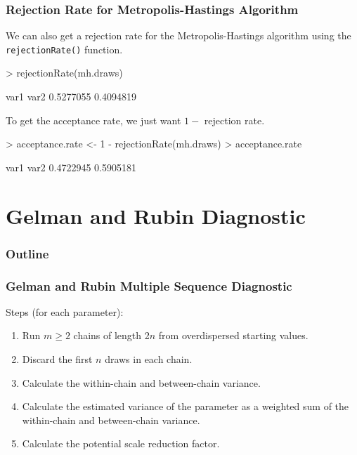 \documentclass{beamer}
\begin{document}
\begin{frame}[fragile]
\frametitle{Rejection Rate for Metropolis-Hastings Algorithm}
\pause
We can also get a rejection rate for the Metropolis-Hastings algorithm
using the {\tt rejectionRate()} function.
\pause
\medskip
\tiny
\begin{Schunk}
\begin{Sinput}
> rejectionRate(mh.draws)
\end{Sinput}
\begin{Soutput}
     var1      var2 
0.5277055 0.4094819 
\end{Soutput}
\end{Schunk}
\normalsize
\bigskip
\pause
To get the acceptance rate, we just want $1 - $ rejection rate.
\pause
\medskip
\tiny
\begin{Schunk}
\begin{Sinput}
> acceptance.rate <- 1 - rejectionRate(mh.draws)
> acceptance.rate
\end{Sinput}
\begin{Soutput}
     var1      var2 
0.4722945 0.5905181 
\end{Soutput}
\end{Schunk}
\normalsize
\end{frame}

\section{Gelman and Rubin Diagnostic}

\begin{frame}
\frametitle{Outline}
\tableofcontents[currentsection]
\end{frame}

\begin{frame}
\frametitle{Gelman and Rubin Multiple Sequence Diagnostic}
\pause
Steps (for each parameter):
\pause
\begin{enumerate}
\item Run $m \ge 2$ chains of length 2$n$ from overdispersed starting values.
\pause
\item Discard the first $n$ draws in each chain.
\pause
\item Calculate the within-chain and between-chain variance.
\pause
\item Calculate the estimated variance of the parameter as a weighted
sum of the within-chain and between-chain variance.
\pause
\item Calculate the potential scale reduction factor.  
\end{enumerate}
\end{frame}
\end{document}
